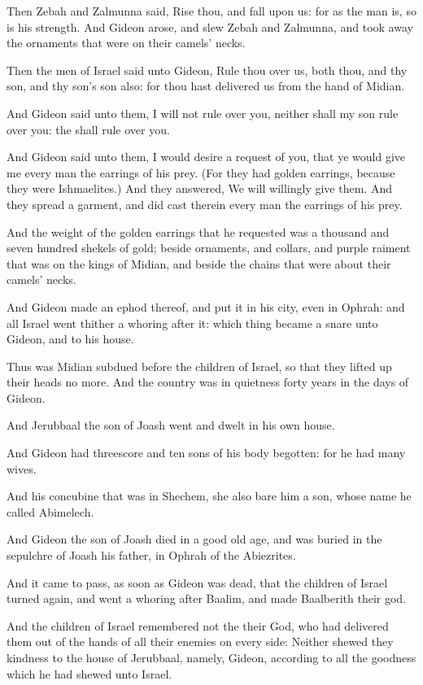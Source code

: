 \Verse Then Zebah and Zalmunna said, Rise thou, and fall upon us: for as the man is, so is his strength. And Gideon arose, and slew Zebah and Zalmunna, and took away the ornaments that were on their camels' necks.

\Verse Then the men of Israel said unto Gideon, Rule thou over us, both thou, and thy son, and thy son's son also: for thou hast delivered us from the hand of Midian.

\Verse And Gideon said unto them, I will not rule over you, neither shall my son rule over you: the \LORD shall rule over you.

\Verse And Gideon said unto them, I would desire a request of you, that ye would give me every man the earrings of his prey. (For they had golden earrings, because they were Ishmaelites.)  \Verse And they answered, We will willingly give them. And they spread a garment, and did cast therein every man the earrings of his prey.

\Verse And the weight of the golden earrings that he requested was a thousand and seven hundred shekels of gold; beside ornaments, and collars, and purple raiment that was on the kings of Midian, and beside the chains that were about their camels' necks.

\Verse And Gideon made an ephod thereof, and put it in his city, even in Ophrah: and all Israel went thither a whoring after it: which thing became a snare unto Gideon, and to his house.

\Verse Thus was Midian subdued before the children of Israel, so that they lifted up their heads no more. And the country was in quietness forty years in the days of Gideon.

\Verse And Jerubbaal the son of Joash went and dwelt in his own house.

\Verse And Gideon had threescore and ten sons of his body begotten: for he had many wives.

\Verse And his concubine that was in Shechem, she also bare him a son, whose name he called Abimelech.

\Verse And Gideon the son of Joash died in a good old age, and was buried in the sepulchre of Joash his father, in Ophrah of the Abiezrites.

\Verse And it came to pass, as soon as Gideon was dead, that the children of Israel turned again, and went a whoring after Baalim, and made Baalberith their god.

\Verse And the children of Israel remembered not the \LORD their God, who had delivered them out of the hands of all their enemies on every side: \Verse Neither shewed they kindness to the house of Jerubbaal, namely, Gideon, according to all the goodness which he had shewed unto Israel.


